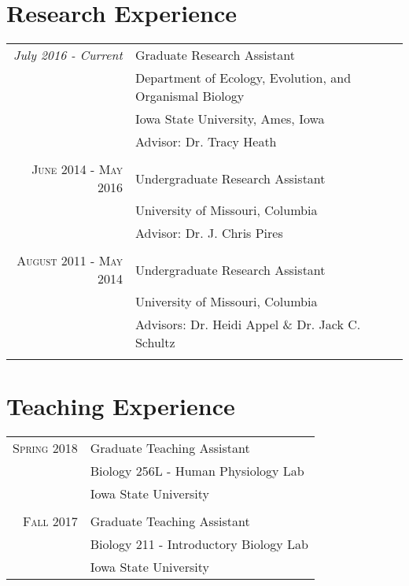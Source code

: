 \documentclass[12pt]{article}
\begin{document}
\section{Research Experience}
\begin{tabular}{r|l}	
  \emph{July 2016 - Current} & Graduate Research Assistant \\
   & Department of Ecology, Evolution, and Organismal Biology \\
  & Iowa State University, Ames, Iowa \\
 &  Advisor: Dr. Tracy Heath \\\multicolumn{2}{c}{} \\
  \textsc{June 2014 - May 2016} & Undergraduate Research Assistant \\
& University of Missouri, Columbia \\
& Advisor: Dr. J. Chris Pires \\\multicolumn{2}{c}{} \\
 \textsc{August 2011 - May 2014} & Undergraduate Research Assistant \\
 & University of Missouri, Columbia \\
 & Advisors: Dr. Heidi Appel \& Dr. Jack C. Schultz \\\multicolumn{2}{c}{} \\

\end{tabular}

\section{Teaching Experience}
\begin{tabular}{r|l}
  \textsc{Spring} 2018 & Graduate Teaching Assistant \\
   & Biology 256L - Human Physiology Lab \\
  & Iowa State University \\
 \multicolumn{2}{c}{} \\	
  \textsc{Fall} 2017 & Graduate Teaching Assistant \\
   & Biology 211 - Introductory Biology Lab \\
  & Iowa State University \\
\end{tabular}

\end{document}
